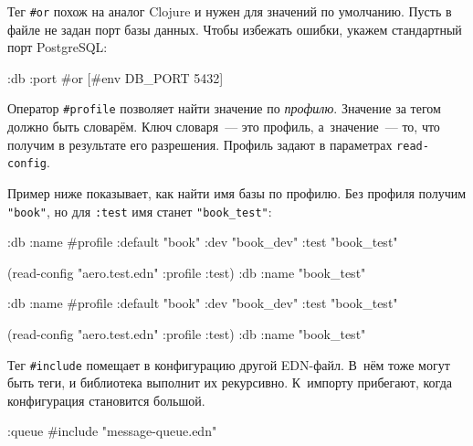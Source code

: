\fi

Тег \verb|#or| похож на аналог Clojure и нужен для значений по
умолчанию. Пусть в файле не задан порт базы данных. Чтобы избежать ошибки,
укажем стандартный порт PostgreSQL:

\begin{english}
  \begin{clojure}
{:db {:port #or [#env DB_PORT 5432]}}
  \end{clojure}
\end{english}


Оператор \verb|#profile| позволяет найти значение по
\emph{профилю}. Значение за тегом должно быть словарём. Ключ словаря~--- это
профиль, а~значение~--- то, что получим в результате его разрешения. Профиль
задают в параметрах \verb|read-config|.

Пример ниже показывает, как найти имя базы по профилю. Без профиля получим
\verb|"book"|, но для \verb|:test| имя станет \verb|"book_test"|:

\ifx\devicetype\mobile

\begin{english}
  \begin{clojure}
{:db
 {:name
  #profile {:default "book"
            :dev     "book_dev"
            :test    "book_test"}}}

(read-config "aero.test.edn"
  {:profile :test})
{:db {:name "book_test"}}
  \end{clojure}
\end{english}

\else

\begin{english}
  \begin{clojure}
{:db {:name #profile {:default "book"
                      :dev     "book_dev"
                      :test    "book_test"}}}

(read-config "aero.test.edn" {:profile :test})
{:db {:name "book_test"}}
  \end{clojure}
\end{english}

\fi

Тег \verb|#include| помещает в конфигурацию другой EDN-файл. В~нём тоже могут
быть теги, и библиотека выполнит их рекурсивно. К~импорту прибегают, когда
конфигурация становится большой.

\begin{english}
  \begin{clojure}
{:queue #include "message-queue.edn"}
  \end{clojure}
\end{english}


